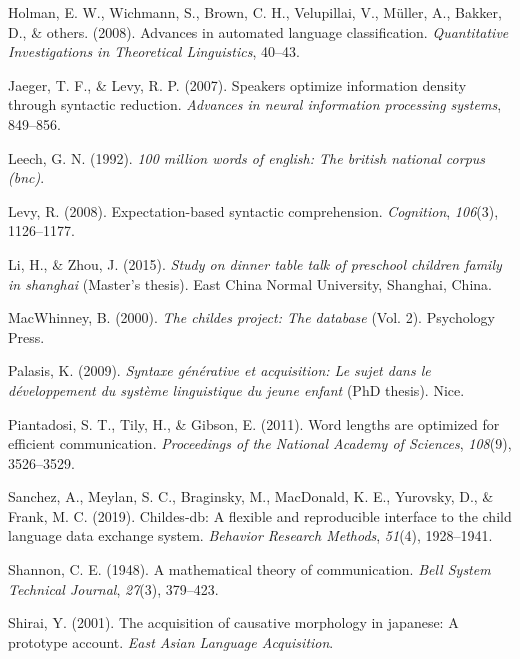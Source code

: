 \documentclass[11pt,]{article}
\begin{document}
\leavevmode\hypertarget{ref-holman2008advances}{}%
Holman, E. W., Wichmann, S., Brown, C. H., Velupillai, V., Müller, A., Bakker, D., \& others. (2008). Advances in automated language classification. \emph{Quantitative Investigations in Theoretical Linguistics}, 40--43.

\leavevmode\hypertarget{ref-jaeger2007speakers}{}%
Jaeger, T. F., \& Levy, R. P. (2007). Speakers optimize information density through syntactic reduction. \emph{Advances in neural information processing systems}, 849--856.

\leavevmode\hypertarget{ref-leech1992100}{}%
Leech, G. N. (1992). \emph{100 million words of english: The british national corpus (bnc)}.

\leavevmode\hypertarget{ref-levy2008expectation}{}%
Levy, R. (2008). Expectation-based syntactic comprehension. \emph{Cognition}, \emph{106}(3), 1126--1177.

\leavevmode\hypertarget{ref-li2015dinner}{}%
Li, H., \& Zhou, J. (2015). \emph{Study on dinner table talk of preschool children family in shanghai} (Master's thesis). East China Normal University, Shanghai, China.

\leavevmode\hypertarget{ref-macwhinney2000childes}{}%
MacWhinney, B. (2000). \emph{The childes project: The database} (Vol. 2). Psychology Press.

\leavevmode\hypertarget{ref-palasis2009syntaxe}{}%
Palasis, K. (2009). \emph{Syntaxe générative et acquisition: Le sujet dans le développement du système linguistique du jeune enfant} (PhD thesis). Nice.

\leavevmode\hypertarget{ref-piantadosi2011word}{}%
Piantadosi, S. T., Tily, H., \& Gibson, E. (2011). Word lengths are optimized for efficient communication. \emph{Proceedings of the National Academy of Sciences}, \emph{108}(9), 3526--3529.

\leavevmode\hypertarget{ref-sanchez2019childes}{}%
Sanchez, A., Meylan, S. C., Braginsky, M., MacDonald, K. E., Yurovsky, D., \& Frank, M. C. (2019). Childes-db: A flexible and reproducible interface to the child language data exchange system. \emph{Behavior Research Methods}, \emph{51}(4), 1928--1941.

\leavevmode\hypertarget{ref-shannon1948mathematical}{}%
Shannon, C. E. (1948). A mathematical theory of communication. \emph{Bell System Technical Journal}, \emph{27}(3), 379--423.

\leavevmode\hypertarget{ref-shirai2001acquisition}{}%
Shirai, Y. (2001). The acquisition of causative morphology in japanese: A prototype account. \emph{East Asian Language Acquisition}.
\end{document}
